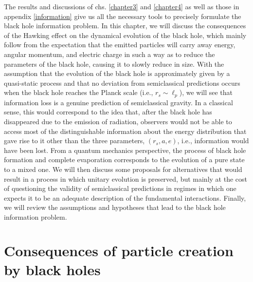 \documentclass[
12pt,		%
openright,	%
twoside,  %
a4paper,			%
chapter=TITLE,		%
english,			%
french,				%
spanish,			%
brazil				%
]{USPSC-classe/USPSC}
\begin{document}
The results and discussions of chs. \ref{chapter3} and \ref{chapter4} as well as those in appendix \ref{information} give us all the necessary tools to precisely formulate the black hole information problem. In this chapter, we will discuss the consequences of the Hawking effect on the dynamical evolution of the black hole, which mainly follow from the expectation that the emitted particles will carry away energy, angular momentum, and electric charge in such a way as to reduce the parameters of the black hole, causing it to slowly reduce in size. With the assumption that the evolution of the black hole is approximately given by a quasi-static process and that no deviation from semiclassical predictions occurs when the black hole reaches the Planck scale (i.e., $r_s\sim\ell_p$), we will see that information loss is a genuine prediction of semiclassical gravity. In a classical sense, this would correspond to the idea that, after the black hole has disappeared due to the emission of radiation, observers would not be able to access most of the distinguishable information about the energy distribution that gave rise to it other than the three parameters, $(r_s,a,e)$, i.e., information would have been lost. From a quantum mechanics perspective, the process of black hole formation and complete evaporation corresponds to the evolution of a pure state to a mixed one. We will then discuss some proposals for alternatives that would result in a process in which unitary evolution is preserved, but mainly at the cost of questioning the validity of semiclassical predictions in regimes in which one expects it to be an adequate description of the fundamental interactions. Finally, we will review the assumptions and hypotheses that lead to the black hole information problem.

\section{Consequences of particle creation by black holes}\label{evaporation}
\end{document}
